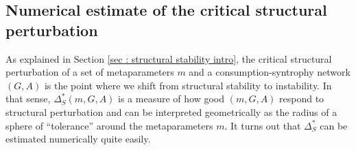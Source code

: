 \documentclass[12pt, titlepage]{report}
\begin{document}


\subsection{Numerical estimate of the critical structural perturbation}\label{sec : structural stability methods numerical estimate critical perturbation}
As explained in Section \ref{sec : structural stability intro}, the critical structural perturbation of a set of metaparameters $m$ and a consumption-syntrophy network $(G,A)$ is the point where we shift from structural stability to instability. In that sense, $\Delta_S^*(m, G, A)$ is a measure of how good $(m, G, A)$ respond to structural perturbation and can be interpreted geometrically as the radius of a sphere of ``tolerance'' around the metaparameters $m$. It turns out that $\Delta_S^*$ can be estimated numerically quite easily.
\end{document}
